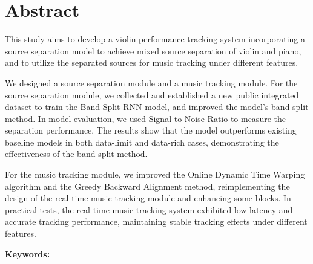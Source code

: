 \documentclass[class=NCU_thesis, crop=false]{standalone}
\begin{document}
\chapter{Abstract}

This study aims to develop a violin performance tracking system 
incorporating a source separation model to achieve mixed source separation 
of violin and piano, 
and to utilize the separated sources for music tracking under different features.

We designed a source separation module and a music tracking module. 
For the source separation module, 
we collected and established a new public integrated dataset to train the Band-Split RNN model, 
and improved the model's band-split method. 
In model evaluation, we used Signal-to-Noise Ratio 
to measure the separation performance.
The results show that the model outperforms existing baseline models 
in both data-limit and data-rich cases, 
demonstrating the effectiveness of the band-split method.

For the music tracking module, 
we improved the Online Dynamic Time Warping algorithm and 
the Greedy Backward Alignment method, 
reimplementing the design of the real-time music tracking module and 
enhancing some blocks. 
In practical tests, the real-time music tracking system exhibited 
low latency and accurate tracking performance, 
maintaining stable tracking effects under different features.

\vspace{2em}
\noindent \textbf{Keywords:} \keywordsEn{} %
\end{document}

